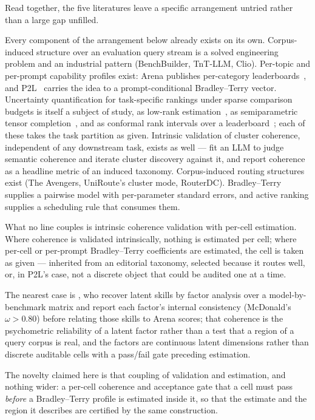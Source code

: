Read together, the five literatures leave a specific arrangement
untried rather than a large gap unfilled.

Every component of the arrangement below already exists on its own.
Corpus-induced structure over an evaluation query stream is a solved
engineering problem and an industrial pattern (BenchBuilder, TnT-LLM,
Clio). Per-topic and per-prompt capability profiles exist: Arena
publishes per-category leaderboards~\parencite{arena2025categories,
arena2025expert},
and P2L~\parencite{frick2025p2l} carries the idea to a
prompt-conditional Bradley--Terry vector. Uncertainty quantification
for task-specific rankings under sparse comparison budgets is itself a
subject of study, as low-rank estimation~\parencite{li2026lowrank}, as
semiparametric tensor completion~\parencite{li2026tensor}, and as
conformal rank intervals over a
leaderboard~\parencite{neuhof2026rankintervals}; each of these takes
the task partition as given. Intrinsic
validation of cluster coherence, independent of any downstream task,
exists as well --- \textcite{hong2025dialin} fit an LLM to judge
semantic coherence and iterate cluster discovery against it, and
\textcite{kargupta2025taxoadapt} report coherence as a headline
metric of an induced taxonomy. Corpus-induced routing structures
exist (The Avengers, UniRoute's cluster mode, RouterDC). Bradley--Terry
supplies a pairwise model with per-parameter standard errors, and
active ranking supplies a scheduling rule that consumes them.

What no line couples is intrinsic coherence validation with per-cell
estimation. Where coherence is validated
intrinsically, nothing is estimated per cell; where per-cell or
per-prompt Bradley--Terry coefficients are estimated, the cell is
taken as given --- inherited from an editorial taxonomy, selected
because it routes well, or, in P2L's case, not a discrete object that
could be audited one at a time.

The nearest case is
\textcite{maimon2025skills}, who recover latent skills by factor
analysis over a model-by-benchmark matrix and report each factor's
internal consistency (McDonald's $\omega > 0.80$) before relating
those skills to Arena scores; that coherence is the psychometric
reliability of a latent factor rather than a test that a region of a
query corpus is real, and the factors are continuous latent dimensions
rather than discrete auditable cells with a pass/fail gate preceding
estimation.

The novelty claimed here is that coupling of validation and
estimation, and nothing wider: a per-cell coherence and acceptance
gate that a cell must pass \textit{before} a Bradley--Terry profile is
estimated inside it, so that the estimate and the region it describes
are certified by the same construction.

